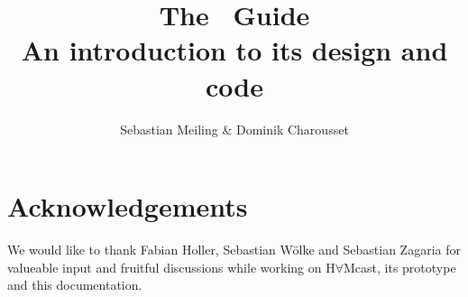 \documentclass{scrartcl}
\author{Sebastian Meiling \& Dominik Charousset}
\title{The \hamcast\ Guide \\ \small An introduction to its design and
code}
\newcommand{\hamcast}{\mbox{\sf H\boldmath$\forall$Mcast}}
\begin{document}
\maketitle







\section{Acknowledgements}
We would like to thank Fabian Holler, Sebastian Wölke and Sebastian
Zagaria for valueable input and fruitful discussions while working on
\hamcast, its prototype and this documentation.


\end{document}
